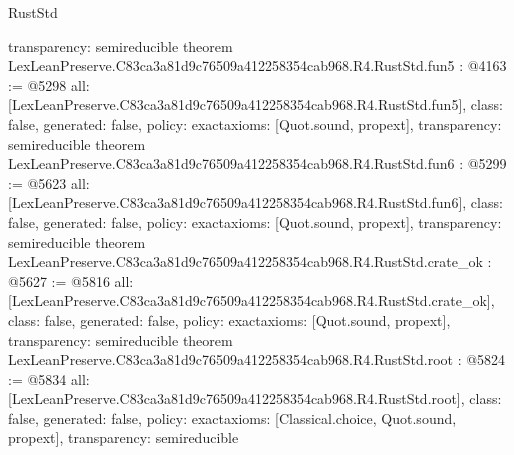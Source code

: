 \begin{lexlean}{RustStd}
\begin{coremodule}
{  transparency: semireducible
}
theorem LexLeanPreserve.C83ca3a81d9c76509a412258354cab968.R4.RustStd.fun5 : @4163 := @5298 {
  all: [LexLeanPreserve.C83ca3a81d9c76509a412258354cab968.R4.RustStd.fun5],
  class: false,
  generated: false,
  policy: exact{axioms: [Quot.sound, propext]},
  transparency: semireducible
}
theorem LexLeanPreserve.C83ca3a81d9c76509a412258354cab968.R4.RustStd.fun6 : @5299 := @5623 {
  all: [LexLeanPreserve.C83ca3a81d9c76509a412258354cab968.R4.RustStd.fun6],
  class: false,
  generated: false,
  policy: exact{axioms: [Quot.sound, propext]},
  transparency: semireducible
}
theorem LexLeanPreserve.C83ca3a81d9c76509a412258354cab968.R4.RustStd.crate_ok : @5627 := @5816 {
  all: [LexLeanPreserve.C83ca3a81d9c76509a412258354cab968.R4.RustStd.crate_ok],
  class: false,
  generated: false,
  policy: exact{axioms: [Quot.sound, propext]},
  transparency: semireducible
}
theorem LexLeanPreserve.C83ca3a81d9c76509a412258354cab968.R4.RustStd.root : @5824 := @5834 {
  all: [LexLeanPreserve.C83ca3a81d9c76509a412258354cab968.R4.RustStd.root],
  class: false,
  generated: false,
  policy: exact{axioms: [Classical.choice, Quot.sound, propext]},
  transparency: semireducible
}


\end{coremodule}
\end{lexlean}
